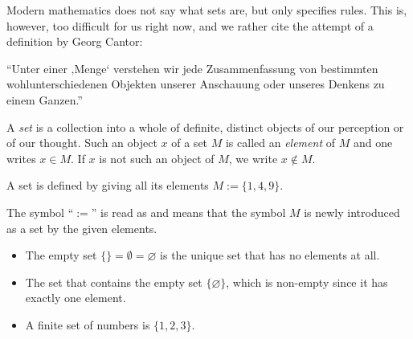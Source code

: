 

%
Modern mathematics does not say what sets are, but only specifies rules. This is, however, too difficult for us right now, 
and we rather cite the attempt of a definition by Georg Cantor:

\begin{Boxx}{}
``Unter einer ‚Menge‘ verstehen wir jede Zusammenfassung von bestimmten wohlunterschiedenen Objekten unserer Anschauung oder unseres Denkens zu einem Ganzen.''
\end{Boxx}

\begin{Definition}
A \emph{set} is a collection into a whole of definite, distinct objects of our perception or of our thought.
Such an object $x$ of a set $M$ is called an \textit{element} of $M$ 
and one writes $x\in M$. If $x$ is not such an object of $M$, we write $x\not\in M$.
\end{Definition}

A set is defined by giving all its elements $M:=\{1,4,9\}$.

\begin{Boxx}{}
The symbol ``$:=$'' is read as  and
means that the symbol $M$ is newly introduced as a set by the given elements.
\end{Boxx}
%

\begin{example}
\begin{itemize}
 \item The empty set $\{\} = \emptyset = \varnothing$
 is the unique set that has no elements at all.
 \item The set that contains the empty set $\{ \varnothing \}$, which is non-empty
 since it has exactly one element.
 \item A finite set of numbers is $\{ 1,2,3\}$.
\end{itemize}
\end{example}

